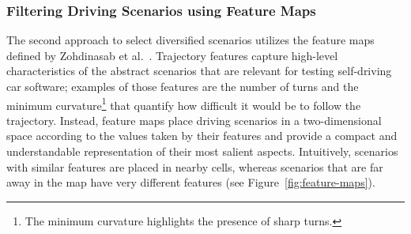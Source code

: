 \documentclass[conference]{IEEEtran}
\begin{document}

\subsubsection{Filtering Driving Scenarios using Feature Maps}
The second approach to select diversified scenarios utilizes the feature maps defined by Zohdinasab et al.~\cite{DBLP:conf/issta/ZohdinasabRGT21}. 
Trajectory features capture high-level characteristics of the abstract scenarios that are relevant for testing self-driving car software; examples of those features are the number of turns and the minimum curvature\footnote{The minimum curvature highlights the presence of sharp turns.} that quantify how difficult it would be to follow the trajectory. Instead, feature maps place driving scenarios in a two-dimensional space according to the values taken by their features and provide a compact and understandable representation of their most salient aspects. Intuitively, scenarios with similar features are placed in nearby cells, whereas scenarios that are far away in the map have very different features (see Figure~\ref{fig:feature-maps}).
\end{document}
